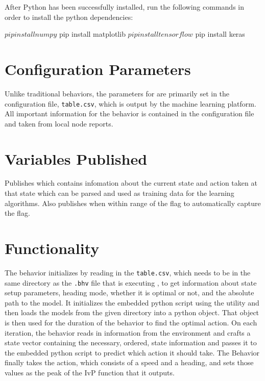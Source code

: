 \documentclass[onecolumn,letterpaper,11pt]{article}
\begin{document}
	After Python has been successfully installed, run the following commands in order to install the python dependencies:
	
	\vspace{0.15in}
	\begin{fileverb} 
		$ pip install numpy
		$ pip install matplotlib
		$ pip install tensorflow
		$ pip install keras
	\end{fileverb}
	\vspace{0.15in}
	
	
	
	
	\section{Configuration Parameters}
	
	Unlike traditional behaviors, the parameters for  are primarily set in the configuration file, \texttt{table.csv}, which is output by the machine learning platform. All important information for the behavior is contained in the configuration file and taken from local node reports. 
	
	\section{Variables Published}
	
	Publishes  which contains infomation about the current state and action taken at that state which can be parsed and used as training data for the learning algorithms. Also publishes  when within range of the flag to automatically capture the flag. 
	
	\section{Functionality} 
	
	The behavior initializes by reading in the \texttt{table.csv}, which needs to be in the same directory as the \texttt{.bhv} file that is executing , to get information about state setup parameters, heading mode, whether it is optimal or not, and the absolute path to the model. It initializes the embedded python script using the  utility and then loads the models from the given directory into a python object. That object is then used for the duration of the behavior to find the optimal action. On each iteration, the behavior reads in information from the environment and crafts a state vector containing the necessary, ordered, state information and passes it to the embedded python script to predict which action it should take. The Behavior finally takes the action, which consists of a speed and a heading, and sets those values as the peak of the IvP function that it outputs. 
	
\end{document}
